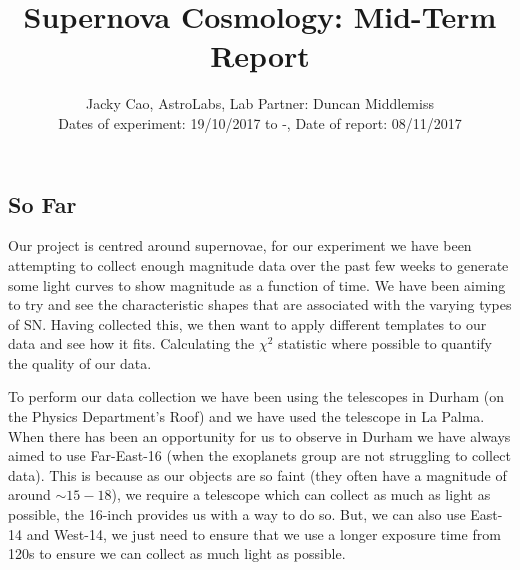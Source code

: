 \documentclass[twocolumn]{revtex4}
\begin{document}
\textheight=26.385cm

\title{Supernova Cosmology: Mid-Term Report}
 
\author{Jacky Cao, AstroLabs, Lab Partner: Duncan Middlemiss \\ Dates of experiment: 19/10/2017 to -, Date of report: 08/11/2017}
\maketitle
\vspace{-3ex}
\subsection{So Far} 
\vspace{-2ex}

Our project is centred around supernovae, for our experiment we have been attempting to collect enough magnitude data over the past few weeks to generate some light curves to show magnitude as a function of time. We have been aiming to try and see the characteristic shapes that are associated with the varying types of SN. Having collected this, we then want to apply different templates to our data and see how it fits. Calculating the $\chi^2$ statistic where possible to quantify the quality of our data.

To perform our data collection we have been using the telescopes in Durham (on the Physics Department's Roof) and we have used the telescope in La Palma. When there has been an opportunity for us to observe in Durham we have always aimed to use Far-East-16 (when the exoplanets group are not struggling to collect data). This is because as our objects are so faint (they often have a magnitude of around $\sim 15 - 18$), we require a telescope which can collect as much as light as possible, the 16-inch provides us with a way to do so. But, we can also use East-14 and West-14, we just need to ensure that we use a longer exposure time from 120s to ensure we can collect as much light as possible. 
\end{document}
